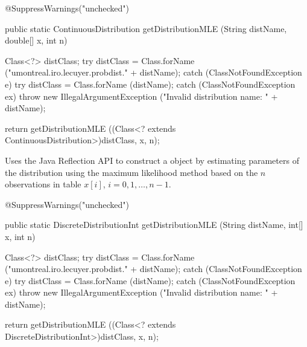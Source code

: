 \begin{code}

\begin{hide} @SuppressWarnings("unchecked")
\end{hide}   public static ContinuousDistribution getDistributionMLE
                    (String distName, double[] x, int n)\begin{hide} {

      Class<?> distClass;
      try
      {
         distClass = Class.forName ("umontreal.iro.lecuyer.probdist." + distName);
      }
      catch (ClassNotFoundException e)
      {
         try
         {
            distClass = Class.forName (distName);
         }
         catch (ClassNotFoundException ex)
         {
            throw new IllegalArgumentException ("Invalid distribution name: " 
                                                + distName);
         }
      }

      return getDistributionMLE ((Class<? extends ContinuousDistribution>)distClass, x, n);
   }\end{hide}
\end{code}
\begin{tabb}
   Uses the Java Reflection API to construct a 
   object by estimating parameters of the distribution using the maximum likelihood
   method based on the $n$ observations in table $x[i]$, $i = 0, 1, \ldots, n-1$.
\end{tabb}
\begin{htmlonly}
\end{htmlonly}
\begin{code}

\begin{hide} @SuppressWarnings("unchecked")
\end{hide}   public static DiscreteDistributionInt getDistributionMLE
                    (String distName, int[] x, int n)\begin{hide} {

      Class<?> distClass;
      try
      {
         distClass = Class.forName ("umontreal.iro.lecuyer.probdist." + distName);
      }
      catch (ClassNotFoundException e)
      {
         try
         {
            distClass = Class.forName (distName);
         }
         catch (ClassNotFoundException ex)
         {
            throw new IllegalArgumentException ("Invalid distribution name: " 
                                                + distName);
         }
      }

      return getDistributionMLE ((Class<? extends DiscreteDistributionInt>)distClass, x, n);
   }\end{hide}
\end{code}
